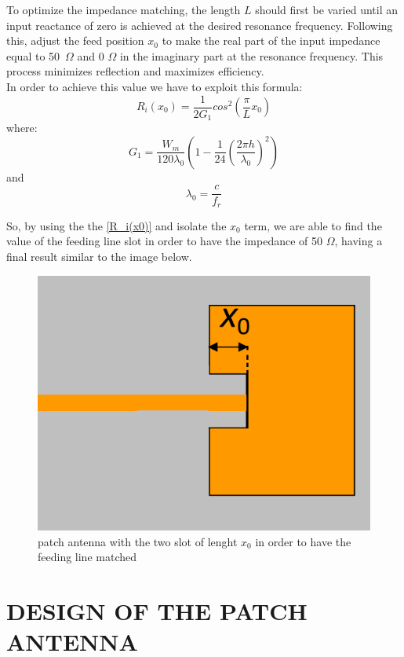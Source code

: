 \documentclass[]{article}
\begin{document}
To optimize the impedance matching, the length $L$ should first be varied until an input reactance of zero is achieved at the desired resonance frequency. Following this, adjust the feed position $x_0$ to make the real part of the input impedance equal to 50~$\Omega$ and 0 $\Omega$ in the imaginary part at the resonance frequency. This process minimizes reflection and maximizes efficiency.\\
In order to achieve this value we have to exploit this formula: 
\begin{equation}
	R_i(x_0)=\frac{1}{2G_1}cos^2(\frac{\pi}{L}x_0)
	\label{R_i(x0)}
\end{equation}
	where: 
	\begin{equation}
		G_1=\frac{W_m}{120 \lambda_0}(1-\frac{1}{24}(\frac{2 \pi h}{\lambda_0})^2)
		\label{G_1}
	\end{equation}
	and 
	\begin{equation}
		\lambda_0=\frac{c}{f_r}
	\end{equation}
	
	So, by using the the \eqref{R_i(x0)} and isolate the $x_0$ term, we are able to find the value of the feeding line slot in order to have the impedance of 50 $\Omega$, having a final result similar to the image below. 
	\begin{figure}[h]
		\centering
		\includegraphics[width=0.4\linewidth]{img/img3}
		\caption{patch antenna with the two slot of lenght $x_0$ in order to have the feeding line matched}
		\label{fig:img3}
	\end{figure}
	\newpage
	\section{DESIGN OF THE PATCH ANTENNA}
\end{document}
